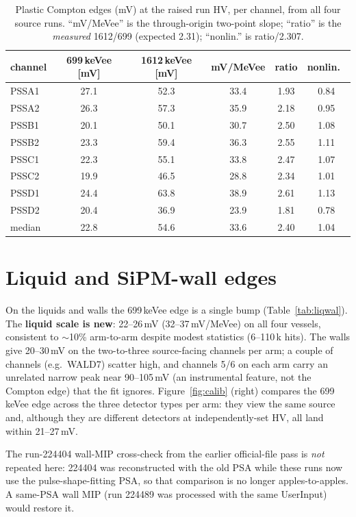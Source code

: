 \documentclass[11pt]{article}
\begin{document}
\begin{table}[H]\centering
\caption{Plastic Compton edges (mV) at the raised run HV, per channel, from all
four source runs. ``mV/MeVee'' is the through-origin two-point slope; ``ratio''
is the \emph{measured} 1612/699 (expected 2.31); ``nonlin.'' is ratio/2.307.}
\label{tab:pss}
\begin{tabular}{lccccc}
\toprule
channel & 699\,keVee [mV] & 1612\,keVee [mV] & mV/MeVee & ratio & nonlin.\ \\
\midrule
PSSA1 & 27.1 & 52.3 & 33.4 & 1.93 & 0.84 \\
PSSA2 & 26.3 & 57.3 & 35.9 & 2.18 & 0.95 \\
PSSB1 & 20.1 & 50.1 & 30.7 & 2.50 & 1.08 \\
PSSB2 & 23.3 & 59.4 & 36.3 & 2.55 & 1.11 \\
PSSC1 & 22.3 & 55.1 & 33.8 & 2.47 & 1.07 \\
PSSC2 & 19.9 & 46.5 & 28.8 & 2.34 & 1.01 \\
PSSD1 & 24.4 & 63.8 & 38.9 & 2.61 & 1.13 \\
PSSD2 & 20.4 & 36.9 & 23.9 & 1.81 & 0.78 \\
\midrule
median & 22.8 & 54.6 & 33.6 & 2.40 & 1.04 \\
\bottomrule
\end{tabular}
\end{table}

\section{Liquid and SiPM-wall edges}
On the liquids and walls the 699\,keVee edge is a single bump
(Table~\ref{tab:liqwal}). The \textbf{liquid scale is new}: 22--26\,mV
(32--37\,mV/MeVee) on all four vessels, consistent to $\sim$10\% arm-to-arm
despite modest statistics (6--110\,k hits). The walls give 20--30\,mV on the
two-to-three source-facing channels per arm; a couple of channels (e.g.\ WALD7)
scatter high, and channels 5/6 on each arm carry an unrelated narrow peak near
90--105\,mV (an instrumental feature, not the Compton edge) that the fit
ignores. Figure~\ref{fig:calib} (right) compares the 699\,keVee edge across the
three detector types per arm: they view the same source and, although they are
different detectors at independently-set HV, all land within 21--27\,mV.

The run-224404 wall-MIP cross-check from the earlier official-file pass is
\emph{not} repeated here: 224404 was reconstructed with the old PSA while these
runs now use the pulse-shape-fitting PSA, so that comparison is no longer
apples-to-apples. A same-PSA wall MIP (run 224489 was processed with the same
UserInput) would restore it.
\end{document}
